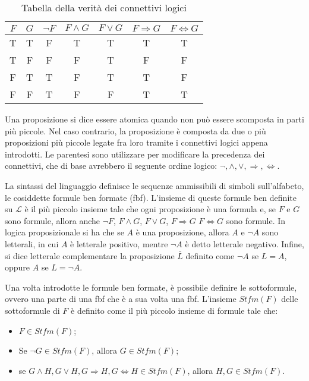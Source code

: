 \begin{table}[!th] \label{Tabella delle verità}
  \caption{Tabella della verità dei connettivi logici}
  \vspace*{10pt}

  \centering
  \begin{tabular}{c c || c | c | c | c | c }
    \(F\) & \(G\) & \(\lnot F\) & \(F \wedge G\) & \(F \vee G\) & \(F \Rightarrow G\) & \(F\Leftrightarrow G\) \\
    \hline
    T & T & F & T & T & T & T \\
    T & F & F & F & T & F & F \\
    F & T & T & F & T & T & F \\
    F & F & T & F & F & T & T \\
  \end{tabular}  
\end{table}

Una proposizione si dice essere atomica quando non può essere scomposta in parti più piccole. Nel caso contrario, la proposizione è composta da due o più proposizioni più piccole legate fra loro tramite i connettivi logici appena introdotti. Le parentesi sono utilizzare per modificare la precedenza dei connettivi, che di base avrebbero il seguente ordine logico: \(\lnot, \wedge, \vee, \Rightarrow, \Leftrightarrow\).

La sintassi del linguaggio definisce le sequenze ammissibili di simboli sull'alfabeto, le cosiddette formule ben formate (fbf). L'insieme di queste formule ben definite su \(\mathcal L\) è il più piccolo insieme tale che ogni proposizione è una formula e, se \(F\) e \(G\) sono formule, allora anche \(\lnot F\), \(F \wedge G\), \(F \vee G\), \(F \Rightarrow G\) \(F \Leftrightarrow G\) sono formule. In logica proposizionale si ha che se \(A\) è una proposizione, allora \(A\) e \(\lnot A\) sono letterali, in cui \(A\) è letterale positivo, mentre \(\lnot A\) è detto letterale negativo. Infine, si dice letterale complementare la proposizione \(\bar L\) definito come \(\lnot A\) se \(L=A\), oppure \(A\) se \(L=\lnot A\). 

Una volta introdotte le formule ben formate, è possibile definire le sottoformule, ovvero una parte di una fbf che è a sua volta una fbf. L'insieme  \(Stfm(F)\) delle sottoformule di \(F\) è definito come il più piccolo insieme di formule tale che:
\begin{itemize}
  \item \(F \in Stfm(F)\);
  \item Se \(\lnot G \in Stfm(F)\), allora \(G \in Stfm(F)\);
  \item se \(G \wedge H, G\vee H, G \Rightarrow H, G \Leftrightarrow H \in Stfm(F)\), allora \(H, G \in Stfm(F)\). 
\end{itemize}

